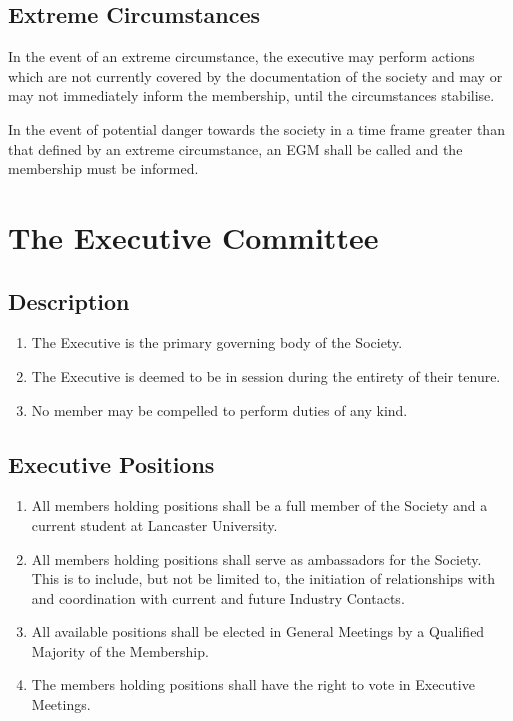 \documentclass[parskip=half]{scrartcl}
\begin{document}
        \subsection{Extreme Circumstances}
            \label{membership--extreme-circumstances}
            In the event of an extreme circumstance, the executive may perform actions which are not currently covered by the documentation of the society and may or may not immediately inform the membership, until the circumstances stabilise.

            In the event of potential danger towards the society in a time frame greater than that defined by an extreme circumstance, an EGM shall be called and the membership must be informed.

    \clearpage
    \section{The Executive Committee}
        \label{executive}
        \subsection{Description}
        \label{executive--description}
        \begin{enumerate}
            \item The Executive is the primary governing body of the Society.
            \item The Executive is deemed to be in session during the entirety of their tenure.
            \item No member may be compelled to perform duties of any kind.
        \end{enumerate}
        
        \subsection{Executive Positions}
            \label{executive--executive-positions}
            \begin{enumerate}
                \item All members holding positions shall be a full member of the Society and a current student at Lancaster University.

                \item All members holding positions shall serve as ambassadors for the Society. This is to include, but not be limited to, the initiation of relationships with and coordination with current and future Industry Contacts.

                \item All available positions shall be elected in General Meetings by a Qualified Majority of the Membership.

                \item The members holding positions shall have the right to vote in Executive Meetings.

            \end{enumerate}
            
\end{document}
